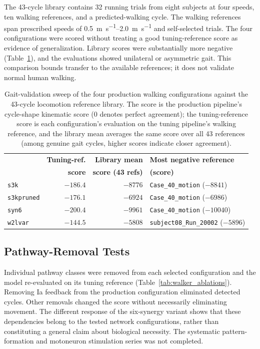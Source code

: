 The 43-cycle library contains 32 running trials from eight subjects at four speeds, ten walking references, and a predicted-walking cycle. The walking references span prescribed speeds of \qtyrange{0.5}{2.0}{\meter\per\second} and self-selected trials. The four configurations were scored without treating a good tuning-reference score as evidence of generalization. Library scores were substantially more negative (Table~\ref{tab:gait_sweep}), and the evaluations showed unilateral or asymmetric gait. This comparison bounds transfer to the available references; it does not validate normal human walking.

\begin{table}[htbp]
\caption{Gait-validation sweep of the four production walking configurations against the 43-cycle locomotion reference library. The score is the production pipeline's cycle-shape kinematic score (0 denotes perfect agreement); the tuning-reference score is each configuration's evaluation on the tuning pipeline's walking reference, and the library mean averages the same score over all 43 references (among genuine gait cycles, higher scores indicate closer agreement).}
\label{tab:gait_sweep}
\begin{tabular}{@{}lrrl@{}}
\toprule
 & \textbf{Tuning-ref.} & \textbf{Library mean} & \textbf{Most negative reference} \\
 & \textbf{score} & \textbf{score (43 refs)} & \textbf{(score)} \\
\midrule
\texttt{s3k}        & $-186.4$ & $-8776$ & \texttt{Case\_40\_motion} ($-8841$) \\
\texttt{s3kpruned}  & $-176.1$ & $-6924$ & \texttt{Case\_40\_motion} ($-6986$) \\
\texttt{syn6}       & $-200.4$ & $-9961$ & \texttt{Case\_40\_motion} ($-10040$) \\
\texttt{w2lvar}     & $-144.5$ & $-5808$ & \texttt{subject08\_Run\_20002} ($-5896$) \\
\bottomrule
\end{tabular}
\end{table}

\subsection{Pathway-Removal Tests}\label{sec:walker_variant_results}

Individual pathway classes were removed from each selected configuration and the model re-evaluated on its tuning reference (Table~\ref{tab:walker_ablations}). Removing Ia feedback from the production configuration eliminated detected cycles. Other removals changed the score without necessarily eliminating movement. The different response of the six-synergy variant shows that these dependencies belong to the tested network configurations, rather than constituting a general claim about biological necessity. The systematic pattern-formation and motoneuron stimulation series was not completed.

